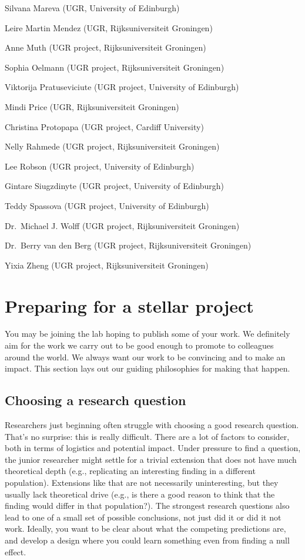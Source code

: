 \documentclass[12pt,]{book}
\theoremstyle{definition}
\theoremstyle{definition}
\theoremstyle{definition}
\theoremstyle{remark}
\begin{document}
Silvana Mareva (UGR, University of Edinburgh)

Leire Martin Mendez (UGR, Rijksuniversiteit Groningen)

Anne Muth (UGR project, Rijksuniversiteit Groningen)

Sophia Oelmann (UGR project, Rijksuniversiteit Groningen)

Viktorija Pratuseviciute (UGR project, University of Edinburgh)

Mindi Price (UGR, Rijksuniversiteit Groningen)

Christina Protopapa (UGR project, Cardiff University)

Nelly Rahmede (UGR project, Rijksuniversiteit Groningen)

Lee Robson (UGR project, University of Edinburgh)

Gintare Siugzdinyte (UGR project, University of Edinburgh)

Teddy Spassova (UGR project, University of Edinburgh)

Dr.~Michael J. Wolff (UGR project, Rijksuniversiteit Groningen)

Dr.~Berry van den Berg (UGR project, Rijksuniversiteit Groningen)

Yixia Zheng (UGR project, Rijksuniversiteit Groningen)

\chapter{Preparing for a stellar project}\label{intro}

You may be joining the lab hoping to publish some of your work. We
definitely aim for the work we carry out to be good enough to promote to
colleagues around the world. We always want our work to be convincing
and to make an impact. This section lays out our guiding philosophies
for making that happen.

\section{Choosing a research
question}\label{choosing-a-research-question}

Researchers just beginning often struggle with choosing a good research
question. That's no surprise: this is really difficult. There are a lot
of factors to consider, both in terms of logistics and potential impact.
Under pressure to find a question, the junior researcher might settle
for a trivial extension that does not have much theoretical depth (e.g.,
replicating an interesting finding in a different population).
Extensions like that are not necessarily uninteresting, but they usually
lack theoretical drive (e.g., is there a good reason to think that the
finding would differ in that population?). The strongest research
questions also lead to one of a small set of possible conclusions, not
just did it or did it not work. Ideally, you want to be clear about what
the competing predictions are, and develop a design where you could
learn something even from finding a null effect.
\end{document}
